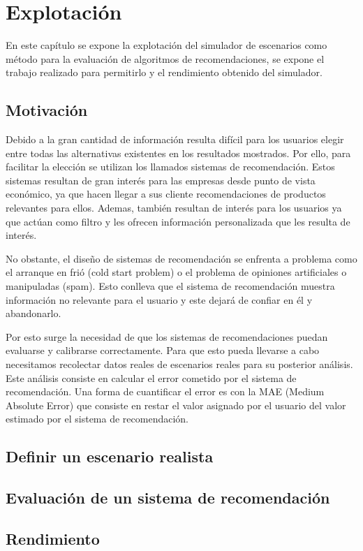 \chapter{Explotación}

En este capítulo se expone la explotación del simulador de escenarios como método para la evaluación de algoritmos de recomendaciones, se expone el trabajo realizado para permitirlo y el rendimiento obtenido del simulador.

\section{Motivación}

Debido a la gran cantidad de información resulta difícil para los usuarios elegir entre todas las alternativas existentes en los resultados mostrados. Por ello, para facilitar la elección se utilizan los llamados sistemas de recomendación. Estos sistemas resultan de gran interés para las empresas desde punto de vista económico, ya que hacen llegar a sus cliente recomendaciones de productos relevantes para ellos. Ademas, también resultan de interés para los usuarios ya que actúan como filtro y les ofrecen información personalizada que les resulta de interés.

No obstante, el diseño de sistemas de recomendación se enfrenta a problema como el arranque en frió (cold
start problem) o el problema de opiniones artificiales o manipuladas (spam). Esto conlleva que el sistema de recomendación muestra información no relevante para el usuario y este dejará de confiar en él y abandonarlo. 

Por esto surge la necesidad de que los sistemas de recomendaciones puedan evaluarse y calibrarse correctamente. Para que esto pueda llevarse a cabo necesitamos recolectar datos reales de escenarios reales para su posterior análisis. Este análisis consiste en calcular el error cometido por el sistema de recomendación. Una forma de cuantificar el error es con la MAE (Medium Absolute Error) que consiste en restar el valor asignado por el usuario del valor estimado por el sistema de recomendación. 

\section{Definir un escenario realista}




\section{Evaluación de un sistema de recomendación}


\section{Rendimiento}


